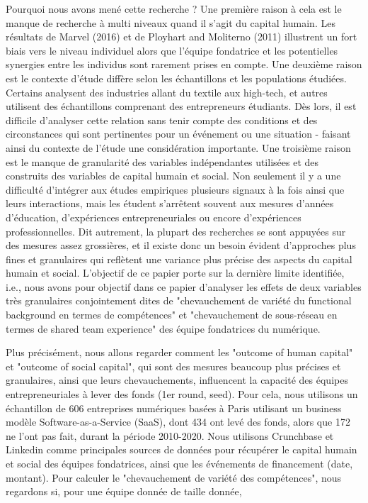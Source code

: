 \documentclass[12pt]{article}
\begin{document}
Pourquoi nous avons mené cette recherche ? Une première raison à cela est le manque de recherche à multi niveaux quand il s'agit du capital humain. Les résultats de Marvel (2016) et de Ployhart and Moliterno (2011) illustrent un fort biais vers le niveau individuel alors que l'équipe fondatrice et les potentielles synergies entre les individus sont rarement prises en compte. Une deuxième raison est le contexte d'étude diffère selon les échantillons et les populations étudiées. Certains analysent des industries allant du textile aux high-tech, et autres utilisent des échantillons comprenant des entrepreneurs étudiants. Dès lors, il est difficile d'analyser cette relation sans tenir compte des conditions et des circonstances qui sont pertinentes pour un événement ou une situation - faisant ainsi du contexte de l'étude une considération importante. Une troisième raison est le manque de granularité des variables indépendantes utilisées et des construits des variables de capital humain et social. Non seulement il y a une difficulté d'intégrer aux études empiriques plusieurs signaux à la fois ainsi que leurs interactions, mais les étudent s'arrêtent souvent aux mesures d'années d'éducation, d'expériences entrepreneuriales ou encore d'expériences professionnelles. Dit autrement, la plupart des recherches se sont appuyées sur des mesures assez grossières, et il existe donc un besoin évident d'approches plus fines et granulaires qui reflètent une variance plus précise des aspects du capital humain et social. L'objectif de ce papier porte sur la dernière limite identifiée, i.e., nous avons pour objectif dans ce papier d'analyser les effets de deux variables très granulaires conjointement dites de "chevauchement de variété du functional background en termes de compétences" et "chevauchement de sous-réseau en termes de shared team experience" des équipe fondatrices du numérique.

Plus précisément, nous allons regarder comment les "outcome of human capital" et "outcome of social capital", qui sont des mesures beaucoup plus précises et granulaires, ainsi que leurs chevauchements, influencent la capacité des équipes entrepreneuriales à lever des fonds (1er round, seed). Pour cela, nous utilisons un échantillon de 606 entreprises numériques basées à Paris utilisant un business modèle Software-as-a-Service (SaaS), dont 434 ont levé des fonds, alors que 172 ne l'ont pas fait, durant la période 2010-2020. Nous utilisons Crunchbase et Linkedin comme principales sources de données pour récupérer le capital humain et social des équipes fondatrices, ainsi que les événements de financement (date, montant). Pour calculer le "chevauchement de variété des compétences", nous regardons si, pour une équipe donnée de taille donnée,
\end{document}

